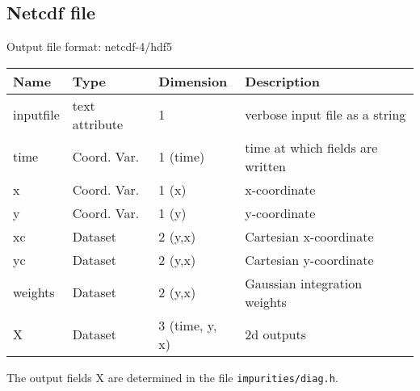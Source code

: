 \subsection{Netcdf file}
Output file format: netcdf-4/hdf5

\begin{longtable}{lll>{\RaggedRight}p{7cm}}
\toprule
\rowcolor{gray!50}\textbf{Name} &  \textbf{Type} & \textbf{Dimension} & \textbf{Description}  \\ \midrule
inputfile        & text attribute & 1 & verbose input file as a string \\
time             & Coord. Var. & 1 (time) & time at which fields are written \\
x                & Coord. Var. & 1 (x) & x-coordinate  \\
y                & Coord. Var. & 1 (y) & y-coordinate \\
xc               & Dataset & 2 (y,x) & Cartesian x-coordinate  \\
yc               & Dataset & 2 (y,x) & Cartesian y-coordinate \\
weights          & Dataset & 2 (y,x) & Gaussian integration weights \\
X                & Dataset & 3 (time, y, x) & 2d outputs \\
\bottomrule
\end{longtable}
The output fields X are determined in the file \texttt{impurities/diag.h}.





